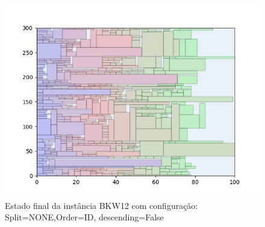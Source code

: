 \begin{figure}[H]
    \centering
    \caption[]{Estado final da instância BKW12 com configuração: Split=NONE,Order=ID, descending=False}
    \label{fig:bkw12-none-id-false}
    \includegraphics[scale=0.5]{output/figures/bkw/bkw12/none/id/false/000}
\end{figure}